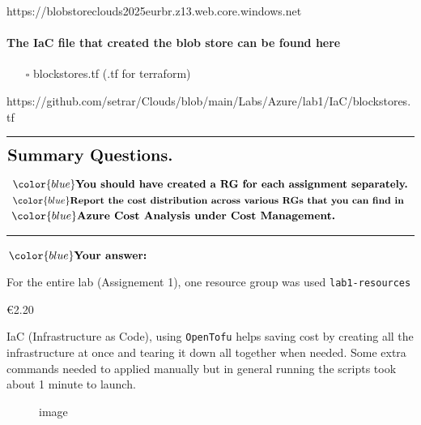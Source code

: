 \documentclass[11pt]{article}
\providecommand{\tightlist}{%
      \setlength{\itemsep}{0pt}\setlength{\parskip}{0pt}}
\begin{document}
https://blobstoreclouds2025eurbr.z13.web.core.windows.net

\paragraph{The IaC file that created the blob store can be found
here}\label{the-iac-file-that-created-the-blob-store-can-be-found-here}

\begin{itemize}
\tightlist
\item[$\square$]
  blockstores.tf (.tf for terraform)
\end{itemize}

https://github.com/setrar/Clouds/blob/main/Labs/Azure/lab1/IaC/blockstores.tf

    \begin{center}\rule{0.5\linewidth}{0.5pt}\end{center}

\(\Large{\textbf{Summary Questions. }}\)

    \(\color{blue}\textbf{You should have created a RG for each assignment separately.}\)
\(\color{blue}\textbf{Report the cost distribution across various RGs that you can find in }\)
\(\color{blue}\textbf{Azure Cost Analysis under Cost Management.}\)

\begin{center}\rule{0.5\linewidth}{0.5pt}\end{center}

\(\color{blue} \textbf{Your answer:}\)

For the entire lab (Assignement 1), one resource group was used
\texttt{lab1-resources}

€2.20

IaC (Infrastructure as Code), using \texttt{OpenTofu} helps saving cost
by creating all the infrastructure at once and tearing it down all
together when needed. Some extra commands needed to applied manually but
in general running the scripts took about 1 minute to launch.

\begin{figure}
\centering
{}
\caption{image}
\end{figure}


    
    
    
\end{document}
